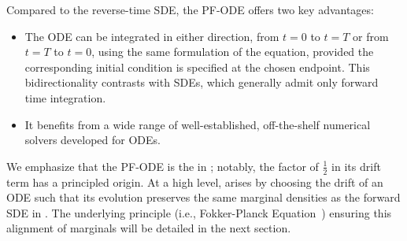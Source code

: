 Compared to the reverse-time SDE, the PF-ODE offers two key advantages:
\begin{itemize}
    \item The ODE can be integrated in either direction, from $t=0$ to $t=T$ or from $t=T$ to $t=0$, using the same formulation of the equation, provided the corresponding initial condition is specified at the chosen endpoint. This bidirectionality contrasts with SDEs, which generally admit only forward time integration.
    \item It benefits from a wide range of well-established, off-the-shelf numerical solvers developed for ODEs.
\end{itemize}


We emphasize that the PF-ODE is  the  in ; notably, the factor of $\frac{1}{2}$ in its drift term has a principled origin. At a high level,  arises by choosing the drift of an ODE such that its evolution preserves the same marginal densities as the forward SDE in . The underlying principle (i.e., Fokker-Planck Equation~\citep{oksendal2003stochastic}) ensuring this alignment of marginals will be detailed in the next section.


\clearpage
\newpage



